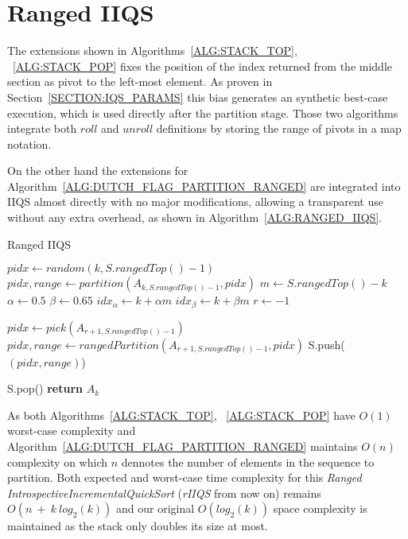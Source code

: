 \section{Ranged IIQS}
The extensions shown in Algorithms~\ref{ALG:STACK_TOP}, ~\ref{ALG:STACK_POP} fixes the position of the index returned from the middle section as pivot to the left-most element. As proven in Section~\ref{SECTION:IQS_PARAMS} this bias generates an synthetic best-case execution, which is used directly after the partition stage. Those two algorithms integrate both $roll$ and $unroll$ definitions by storing the range of pivots in a map notation.


On the other hand the extensions for Algorithm~\ref{ALG:DUTCH_FLAG_PARTITION_RANGED} are integrated into IIQS almost directly with no major modifications, allowing a transparent use without any extra overhead, as shown in Algorithm~\ref{ALG:RANGED_IIQS}.

\begin{algorithm}
  \begin{algorithmic}[1]
    \caption{Ranged IIQS} \label{ALG:RANGED_IIQS}
        \State $pidx \gets random(k,S.rangedTop()-1)$
        \State $pidx, range \gets partition(A_{k,S.rangedTop()-1}, pidx)$
        \State $m \gets S.rangedTop() - k$
        \State $\alpha \gets 0.5$
        \State $\beta \gets 0.65$
        \State $idx_\alpha \gets k + \alpha m$
        \State $idx_\beta \gets k + \beta m$
        \State $r \gets -1$

            \State $pidx \gets pick(A_{r+1,S.rangedTop()-1})$
            \State $pidx, range \gets rangedPartition(A_{r+1,S.rangedTop()-1},pidx)$
        \EndIf
        \State S.push($(pidx, range)$)

    \EndWhile
    \State S.pop()
    \State \textbf{return} $A_{k}$\label{IIQS_main_cycle}
    \EndProcedure
  \end{algorithmic}
\end{algorithm}

As both Algorithms~\ref{ALG:STACK_TOP}, ~\ref{ALG:STACK_POP} have $O(1)$ worst-case complexity and Algorithm~\ref{ALG:DUTCH_FLAG_PARTITION_RANGED} maintains $O(n)$ complexity on which $n$ dennotes the number of elements in the sequence to partition. Both expected and worst-case time complexity for this \emph{Ranged IntrospectiveIncrementalQuickSort} (\emph{rIIQS} from now on) remains $O(n~+~k~log_2(k))$ and our original $O(log_2(k))$ space complexity is maintained as the stack only doubles its size at most.

